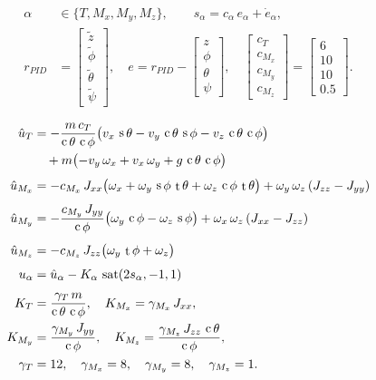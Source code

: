 \documentclass[conf]{new-aiaa}
\DeclareMathOperator{\s}{s}
\DeclareMathOperator{\cs}{c}
\DeclareMathOperator{\tn}{t}
\DeclareMathOperator{\sat}{sat}
\begin{document}
\begin{samepage}
\small
\begin{equation}
\label{eq:smc-defs}
\begin{aligned}
\alpha &\in \{T, M_x, M_y, M_z\}, \qquad s_\alpha = c_\alpha\, e_\alpha + \dot{e}_\alpha, \\
r_{PID} &= \begin{bmatrix} \tilde{z} \\ \tilde{\phi} \\ \tilde{\theta} \\ \tilde{\psi} \end{bmatrix},
\quad
e = r_{PID} - \begin{bmatrix} z \\ \phi \\ \theta \\ \psi \end{bmatrix}, \quad
\begin{bmatrix} c_T \\ c_{M_x} \\ c_{M_y} \\ c_{M_z} \end{bmatrix}
= \begin{bmatrix} 6 \\ 10 \\ 10 \\ 0.5 \end{bmatrix}.
\end{aligned}
\end{equation}

\begin{align}
\hat{u}_T
&= -\frac{m\,c_T}{\cs\theta\,\cs\phi}\bigl(v_x\,\s\theta - v_y\,\cs\theta\,\s\phi - v_z\,\cs\theta\,\cs\phi\bigr) \notag \\
&\quad + m\bigl(-v_y\,\omega_x + v_x\,\omega_y + g\,\cs\theta\,\cs\phi\bigr)
\label{eq:smc1} \\[4pt]
\hat{u}_{M_x}
&= -c_{M_x}\, J_{xx}\bigl(\omega_x + \omega_y\,\s\phi\,\tn\theta + \omega_z\,\cs\phi\,\tn\theta\bigr) + \omega_y\,\omega_z\,(J_{zz} - J_{yy})
\label{eq:smc2} \\[4pt]
\hat{u}_{M_y}
&= -\frac{c_{M_y}\, J_{yy}}{\cs\phi}\bigl(\omega_y\,\cs\phi - \omega_z\,\s\phi\bigr) + \omega_x\,\omega_z\,(J_{xx} - J_{zz})
\label{eq:smc3} \\[4pt]
\hat{u}_{M_z}
&= -c_{M_z}\, J_{zz}\bigl(\omega_y\,\tn\phi + \omega_z\bigr)
\label{eq:smc4} \\[4pt]
u_\alpha
&= \hat{u}_\alpha - K_\alpha\,\sat(2s_\alpha,-1,1)
\label{eq:smc5} \\[4pt]
K_T &= \frac{\gamma_T\,m}{\cs\theta\,\cs\phi}, \quad K_{M_x} = \gamma_{M_x}\,J_{xx}, \notag \\
K_{M_y} &= \frac{\gamma_{M_y}\,J_{yy}}{\cs\phi}, \quad K_{M_z} = \frac{\gamma_{M_z}\,J_{zz}\,\cs\theta}{\cs\phi}, \notag \\
\gamma_T &= 12, \quad \gamma_{M_x} = 8, \quad \gamma_{M_y} = 8, \quad \gamma_{M_z} = 1.
\label{eq:smc-constants2}
\end{align}
\normalsize
\end{samepage}
\end{document}

